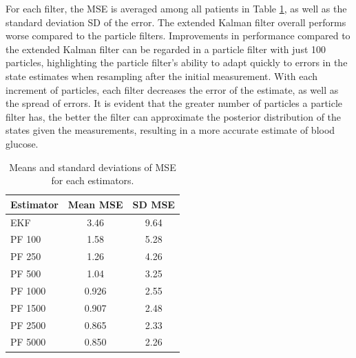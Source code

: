\documentclass[nomenclature, english, bibtex]{kththesis}
\begin{document}
For each filter, the \gls{MSE} is averaged among all patients in Table \ref{tab:estimators}, as well as the standard deviation SD of the error. The extended Kalman filter overall performs worse compared to the particle filters.  Improvements in performance compared to the extended Kalman filter can be regarded in a particle filter with just 100 particles, highlighting the particle filter's ability to adapt quickly to errors in the state estimates when resampling after the initial measurement. With each increment of particles, each filter decreases the error of the estimate, as well as the spread of errors. It is evident that the greater number of particles a particle filter has, the better the filter can approximate the posterior distribution of the states given the measurements, resulting in a more accurate estimate of blood glucose.
\newcommand{\sd}[1]{{\footnotesize\color{gray}(#1)}}
\begin{table}[ht!]
    \centering
    \setlength{\tabcolsep}{6pt}
    \caption[State estimators performance]{Means and standard deviations of MSE for each estimators.}
    \begin{tabular}{lcc}
        \toprule
        \textbf{Estimator} & \textbf{Mean MSE} & \textbf{SD MSE} \\
        \midrule
        EKF & 3.46 & 9.64 \\
        \addlinespace[2pt]

        PF 100 & 1.58 & 5.28 \\
        \addlinespace[2pt]

        PF 250 & 1.26 & 4.26 \\
        \addlinespace[2pt]

        PF 500 & 1.04 & 3.25 \\
        \addlinespace[2pt]

        PF 1000 & 0.926 & 2.55 \\
        \addlinespace[2pt]

        PF 1500 & 0.907 & 2.48 \\
        \addlinespace[2pt]

        PF 2500 & 0.865 & 2.33 \\ 
        \addlinespace[2pt]

        PF 5000 & 0.850 & 2.26 \\
        \bottomrule
    \end{tabular}
    \label{tab:estimators}
\end{table}
\end{document}
